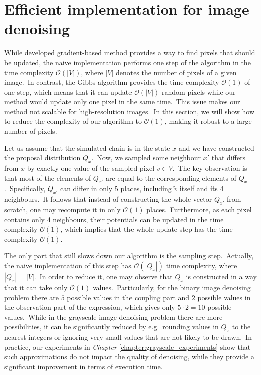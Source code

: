 \documentclass[a4paper, 11pt, onecolumn, openany, titlepage]{report}
\theoremstyle{default_theorem_style}\newtheorem{theorem}{Theorem}
\theoremstyle{default_theorem_style}\newtheorem{definition}{Definition}
\begin{document}
\section{Efficient implementation for image denoising}\label{section:efficient_denoising}

While developed gradient-based method provides a way to find pixels that should be updated, the naive
implementation performs one step of the algorithm in the time complexity $\mathcal{O}(|V|)$,
where $|V|$ denotes the number of pixels of a given image.\ In contrast, the Gibbs
algorithm provides the time complexity $\mathcal{O}(1)$ of one step, which means that it can update
$\mathcal{O}(|V|)$ random pixels while our method would update only one pixel in the same time.\ This issue makes
our method not scalable for high-resolution images.\ In this section, we will show how to reduce the complexity
of our algorithm to $\mathcal{O}(1)$, making it robust to a large number of pixels.\newline

Let us assume that the simulated chain is in the state $x$ and we have constructed the proposal distribution
$Q_x$.\ Now, we sampled some neighbour $x'$ that differs from $x$ by exactly one value of the sampled pixel
$\tilde{v} \in V$.\ The key observation is that most of the elements of $Q_{x'}$ are equal to the corresponding
elements of $Q_x$.\ Specifically, $Q_{x'}$ can differ in only 5 places, including $\tilde{v} $ itself and its
4 neighbours.\ It follows that instead of constructing the whole vector $Q_{x'}$ from scratch, one may recompute
it in only $\mathcal{O}(1)$ places.\ Furthermore, as each pixel contains only 4 neighbours, their potentials
can be updated in the time complexity $\mathcal{O}(1)$, which implies that the whole update step has the time
complexity $\mathcal{O}(1)$.\newline

The only part that still slows down our algorithm is the sampling step.\ Actually, the naive implementation of this
step has $\mathcal{O}(|Q_x|)$ time complexity, where $|Q_x| = |V|$.\ In order to reduce it, one may
observe that $Q_x$ is constructed in a way that it can take only $\mathcal{O}(1)$ values.\ Particularly,
for the binary image denoising problem there are $5$ possible values in the coupling part and $2$ possible
values in the observation part of the expression, which gives only $5 \cdot 2 = 10$ possible values.\ While in the
grayscale image denoising problem there are more possibilities, it can be significantly reduced by e.g.\ rounding
values in $Q_x$ to the nearest integers or ignoring very small values that are not likely to be drawn.\ In
practice, our experiments in \textit{Chapter} \ref{chapter:grayscale_experiments} show that such
approximations do not impact the quality of denoising, while they provide a significant improvement in terms of
execution time.\newline
\end{document}
